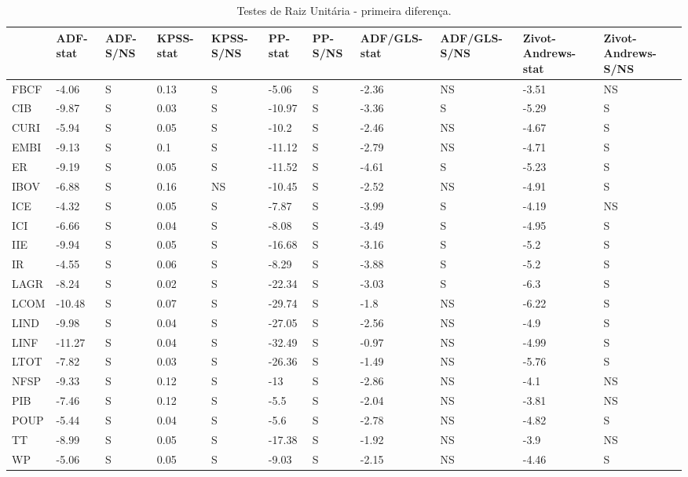 \begin{table}[!htb]
\centering
\caption{Testes de Raiz Unit\'{a}ria - primeira diferen\c{c}a.} 
\label{tab:table-ur-dln-m}
\begin{tabular}{lllllllllll}
  \toprule
 & ADF-stat & ADF-S/NS & KPSS-stat & KPSS-S/NS & PP-stat & PP-S/NS & ADF/GLS-stat & ADF/GLS-S/NS & Zivot-Andrews-stat & Zivot-Andrews-S/NS \\ 
  \midrule
FBCF & -4.06 & S & 0.13 & S & -5.06 & S & -2.36 & NS & -3.51 & NS \\ 
  CIB & -9.87 & S & 0.03 & S & -10.97 & S & -3.36 & S & -5.29 & S \\ 
  CURI & -5.94 & S & 0.05 & S & -10.2 & S & -2.46 & NS & -4.67 & S \\ 
  EMBI & -9.13 & S & 0.1 & S & -11.12 & S & -2.79 & NS & -4.71 & S \\ 
  ER & -9.19 & S & 0.05 & S & -11.52 & S & -4.61 & S & -5.23 & S \\ 
  IBOV & -6.88 & S & 0.16 & NS & -10.45 & S & -2.52 & NS & -4.91 & S \\ 
  ICE & -4.32 & S & 0.05 & S & -7.87 & S & -3.99 & S & -4.19 & NS \\ 
  ICI & -6.66 & S & 0.04 & S & -8.08 & S & -3.49 & S & -4.95 & S \\ 
  IIE & -9.94 & S & 0.05 & S & -16.68 & S & -3.16 & S & -5.2 & S \\ 
  IR & -4.55 & S & 0.06 & S & -8.29 & S & -3.88 & S & -5.2 & S \\ 
  LAGR & -8.24 & S & 0.02 & S & -22.34 & S & -3.03 & S & -6.3 & S \\ 
  LCOM & -10.48 & S & 0.07 & S & -29.74 & S & -1.8 & NS & -6.22 & S \\ 
  LIND & -9.98 & S & 0.04 & S & -27.05 & S & -2.56 & NS & -4.9 & S \\ 
  LINF & -11.27 & S & 0.04 & S & -32.49 & S & -0.97 & NS & -4.99 & S \\ 
  LTOT & -7.82 & S & 0.03 & S & -26.36 & S & -1.49 & NS & -5.76 & S \\ 
  NFSP & -9.33 & S & 0.12 & S & -13 & S & -2.86 & NS & -4.1 & NS \\ 
  PIB & -7.46 & S & 0.12 & S & -5.5 & S & -2.04 & NS & -3.81 & NS \\ 
  POUP & -5.44 & S & 0.04 & S & -5.6 & S & -2.78 & NS & -4.82 & S \\ 
  TT & -8.99 & S & 0.05 & S & -17.38 & S & -1.92 & NS & -3.9 & NS \\ 
  WP & -5.06 & S & 0.05 & S & -9.03 & S & -2.15 & NS & -4.46 & S \\ 
   \bottomrule
\end{tabular}
\end{table}
